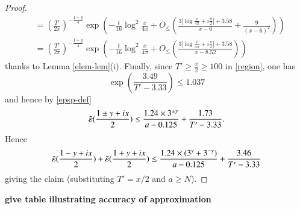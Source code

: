 \begin{proof}
\begin{align*}
&= \left(\frac{T'}{2\pi}\right)^{-\frac{1+y}{4}} \exp\left( - \frac{t}{16} \log^2 \frac{x}{4\pi} + O_{\leq}\left( \frac{3 |\log \frac{x}{4\pi} + i \frac{\pi}{2}|+3.58}{x-6} + \frac{9}{(x-6)^2} \right) \right)\\
&= \left(\frac{T'}{2\pi}\right)^{-\frac{1+y}{4}} \exp\left( - \frac{t}{16} \log^2 \frac{x}{4\pi} + O_{\leq}\left( \frac{3 |\log \frac{x}{4\pi} + i \frac{\pi}{2}|+3.58}{x-8.52} \right) \right)
\end{align*}
thanks to Lemma \ref{elem-lem}(i).  Finally, since $T' \geq \frac{x}{2} \geq 100$ in \eqref{region}, one has 
$$\exp\left(\frac{3.49}{T'-3.33}\right) \leq 1.037$$
and hence by \eqref{epsp-def}
$$ 
\tilde {\varepsilon}(\frac{1 \pm y+ix}{2}) \leq \frac{1.24 \times 3^{\pm y}}{a-0.125} + \frac{1.73}{T'-3.33}.$$
Hence
$$
\tilde {\varepsilon}(\frac{1-y+ix}{2}) + \tilde {\varepsilon}(\frac{1+y+ix}{2}) \leq \frac{1.24 \times (3^y+3^{-y})}{a-0.125} + \frac{3.46}{T'-3.33}$$
giving the claim (substituting $T' = x/2$ and $a \geq N$).
\end{proof}

{\bf give table illustrating accuracy of approximation}